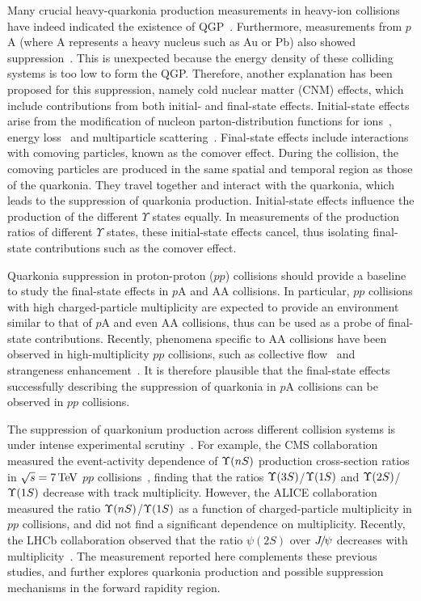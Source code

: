 \documentclass[12pt,a4paper]{article}
\def\Ppsi        {\ensuremath{\uppsi}\xspace}
\def\PUpsilon    {\ensuremath{\Upsilon}\xspace}
\def\PJ      {\ensuremath{\mathrm{J}}\xspace}
\def\Ppsi        {\ensuremath{\psi}\xspace}
\def\PJ      {\ensuremath{J}\xspace}
\def\jpsi     {{\ensuremath{{\PJ\mskip -3mu/\mskip -2mu\Ppsi}}}\xspace}
\def\psitwos  {{\ensuremath{\Ppsi{(2S)}}}\xspace}
\newcommand{\aunit}[1]{\ensuremath{\text{\,#1}}}
\newcommand{\tev}{\aunit{Te\kern -0.1em V}\xspace}
\begin{document}
Many crucial heavy-quarkonia production measurements in heavy-ion collisions have indeed indicated the existence of QGP~\cite{STAR:2022rpk,STAR:2019fge,ALICE:2013osk,CMS:2018zza}. 
Furthermore, measurements from $p$A (where A represents a heavy nucleus such as Au or Pb) also showed suppression~\cite{ALICE:2018szk,LHCb:2013gmv,LHCb:2018psc}. This is unexpected because the energy density of these colliding systems is too low to form the QGP. 
Therefore, another explanation has been proposed for this suppression, namely cold nuclear matter (CNM) effects, which include contributions from both initial- and final-state effects.
Initial-state effects arise from the modification of nucleon parton-distribution functions for ions~\cite{Eskola:2009uj}, energy loss~\cite{Arleo:2014oha} and multiparticle scattering~\cite{Kang:2014hha}. 
Final-state effects include interactions with comoving particles\cite{Ferreiro:2012rq,Ferreiro:2014bia}, known as the comover effect. During the collision, the comoving particles are produced in the same spatial and temporal region as those of the quarkonia. They travel together and interact with the quarkonia, which leads to the suppression of quarkonia production.
Initial-state effects influence the production of the different $\PUpsilon$ states equally. 
In measurements of the production ratios of different $\PUpsilon$ states, these initial-state effects cancel, thus isolating final-state contributions such as the comover effect.


Quarkonia suppression in proton-proton ($pp$) collisions should provide a baseline to study the final-state effects in $p$A and AA collisions. In particular,
$pp$ collisions with high charged-particle multiplicity are expected to provide an environment similar to that of $p$A and even AA collisions, thus can be used as a probe of final-state contributions. Recently, phenomena specific to AA collisions have been observed in high-multiplicity $pp$ collisions, such as collective flow~\cite{CMS:2016fnw} and strangeness enhancement~\cite{ALICE:2016fzo}.
It is therefore plausible that the final-state effects successfully describing the suppression of quarkonia in $p$A collisions can be observed in $pp$ collisions. 

The suppression of quarkonium production across different collision systems is under intense experimental scrutiny~\cite{CMS:2020fae,ALICE:2016flj,ALICE:2018wzm,ALICE:2020eji,CMS:2020fae,LHCb:2020sey,ALICE:2022yzs,PHENIX:2022nrm,ATLAS:2022exb,LHCb:2023xie}.
For example, the CMS collaboration measured the event-activity dependence of $\Yn{n}$ production cross-section ratios in  $\sqrt{s}=7\tev$ $pp$ collisions~\cite{CMS:2020fae}, finding that the ratios $\Yn{3}$/$\Yn{1}$ and $\Yn{2}$/$\Yn{1}$ decrease with track multiplicity. However, the ALICE collaboration measured the ratio $\Yn{n}$/$\Yn{1}$ as a function of
charged-particle multiplicity in $pp$ collisions\cite{ALICE:2022yzs}, and did not find a significant dependence on multiplicity. Recently, the LHCb collaboration observed that the ratio $\psitwos$ over $\jpsi$ decreases with multiplicity~\cite{LHCb:2023xie}. The measurement reported here complements these previous studies, and further explores quarkonia production and possible suppression mechanisms in the forward rapidity region. 
\end{document}

